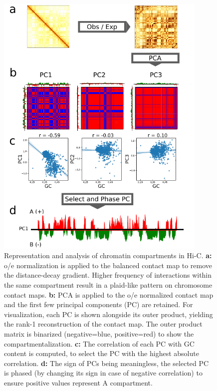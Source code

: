 \begin{figure}[ht!]
    \centering
    \includegraphics[width=0.90\textwidth]{Parts/Part01/gfx/hic_pca_compartments.pdf}
    \caption[Representation and analysis of chromatin compartments in Hi-C.]{Representation and analysis of chromatin compartments in Hi-C. \textbf{a:} \acrfull{o/e} normalization is applied to the balanced contact map to remove the distance-decay gradient. Higher frequency of interactions within the same compartment result in a plaid-like pattern on chromosome contact maps. \textbf{b:} PCA is applied to the \acrshort{o/e} normalized contact map and the first few principal components (PC) are retained. For visualization, each PC is shown alongside its outer product, yielding the rank-1 reconstruction of the contact map. The outer product matrix is binarized (negative=blue, positive=red) to show the compartmentalization. \textbf{c:} The correlation of each PC with GC content is computed, to select the PC with the highest absolute correlation. \textbf{d:} The sign of PCs being meaningless, the selected PC is phased (by changing its sign in case of negative correlation) to ensure positive values represent A compartment.}
    \label{fig:01-02:compartments}
\end{figure}

